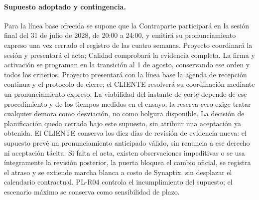 \paragraph{Supuesto adoptado y contingencia.} Para la línea base ofrecida se supone que la Contraparte participará en la sesión final del 31 de julio de 2028, de 20:00 a 24:00, y emitirá su pronunciamiento expreso una vez cerrado el registro de las cuatro semanas. Proyecto coordinará la sesión y presentará el acta; Calidad comprobará la evidencia completa. La firma y activación se programan en la transición al 1 de agosto, conservando ese orden y todos los criterios. Proyecto presentará con la línea base la agenda de recepción continua y el protocolo de cierre; el CLIENTE resolverá su coordinación mediante un pronunciamiento expreso. La viabilidad del instante de corte depende de ese procedimiento y de los tiempos medidos en el ensayo; la reserva cero exige tratar cualquier demora como desviación, no como holgura disponible. La decisión de planificación queda cerrada bajo este supuesto, sin atribuir una aceptación ya obtenida. El CLIENTE conserva los diez días de revisión de evidencia nueva: el supuesto prevé un pronunciamiento anticipado válido, sin renuncia a ese derecho ni aceptación tácita. Si falta el acta, existen observaciones impeditivas o se usa íntegramente la revisión posterior, la puerta bloquea el cambio oficial, se registra el atraso y se extiende marcha blanca a costo de Synaptix, sin desplazar el calendario contractual. PL-R04 controla el incumplimiento del supuesto; el escenario máximo se conserva como sensibilidad de plazo.
